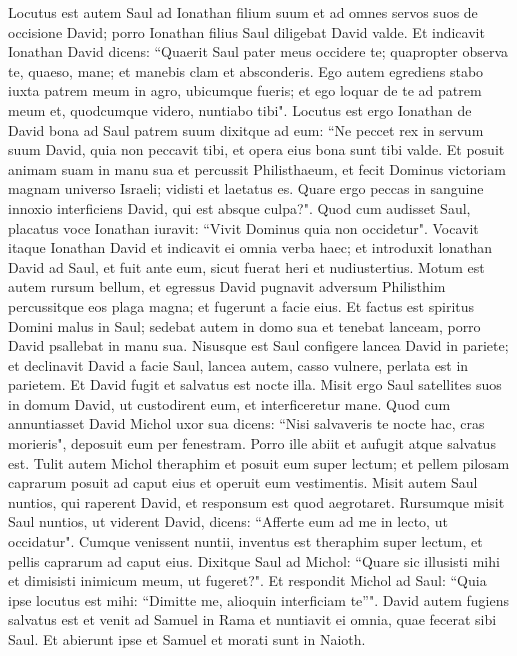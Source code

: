\begin{biblechapter}  
\verse Locutus est autem Saul ad Ionathan filium suum et ad omnes servos suos de occisione David; porro Ionathan filius Saul diligebat David valde. 
\verse Et indicavit Ionathan David dicens: “Quaerit Saul pater meus occidere te; quapropter observa te, quaeso, mane; et manebis clam et absconderis. 
\verse Ego autem egrediens stabo iuxta patrem meum in agro, ubicumque fueris; et ego loquar de te ad patrem meum et, quodcumque videro, nuntiabo tibi". 
\verse Locutus est ergo Ionathan de David bona ad Saul patrem suum dixitque ad eum: “Ne peccet rex in servum suum David, quia non peccavit tibi, et opera eius bona sunt tibi valde. 
\verse Et posuit animam suam in manu sua et percussit Philisthaeum, et fecit Dominus victoriam magnam universo Israeli; vidisti et laetatus es. Quare ergo peccas in sanguine innoxio interficiens David, qui est absque culpa?".  
\verse Quod cum audisset Saul, placatus voce Ionathan iuravit: “Vivit Dominus quia non occidetur". 
\verse Vocavit itaque Ionathan David et indicavit ei omnia verba haec; et introduxit lonathan David ad Saul, et fuit ante eum, sicut fuerat heri et nudiustertius. 
\verse Motum est autem rursum bellum, et egressus David pugnavit adversum Philisthim percussitque eos plaga magna; et fugerunt a facie eius. 
\verse Et factus est spiritus Domini malus in Saul; sedebat autem in domo sua et tenebat lanceam, porro David psallebat in manu sua. 
\verse Nisusque est Saul configere lancea David in pariete; et declinavit David a facie Saul, lancea autem, casso vulnere, perlata est in parietem. Et David fugit et salvatus est nocte illa. 
\verse Misit ergo Saul satellites suos in domum David, ut custodirent eum, et interficeretur mane. Quod cum annuntiasset David Michol uxor sua dicens: “Nisi salvaveris te nocte hac, cras morieris", 
\verse deposuit eum per fenestram. Porro ille abiit et aufugit atque salvatus est. 
\verse Tulit autem Michol theraphim et posuit eum super lectum; et pellem pilosam caprarum posuit ad caput eius et operuit eum vestimentis. 
\verse Misit autem Saul nuntios, qui raperent David, et responsum est quod aegrotaret. 
\verse Rursumque misit Saul nuntios, ut viderent David, dicens: “Afferte eum ad me in lecto, ut occidatur". 
\verse Cumque venissent nuntii, inventus est theraphim super lectum, et pellis caprarum ad caput eius. 
\verse Dixitque Saul ad Michol: “Quare sic illusisti mihi et dimisisti inimicum meum, ut fugeret?". Et respondit Michol ad Saul: “Quia ipse locutus est mihi: “Dimitte me, alioquin interficiam te”". 
\verse David autem fugiens salvatus est et venit ad Samuel in Rama et nuntiavit ei omnia, quae fecerat sibi Saul. Et abierunt ipse et Samuel et morati sunt in Naioth. 

\end{biblechapter}
